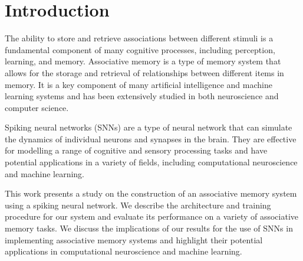 \chapter{Introduction}%

The ability to store and retrieve associations between different stimuli is a
fundamental component of many cognitive processes, including perception,
learning, and memory. Associative memory is a type of memory system that allows
for the storage and retrieval of relationships between different items in
memory. It is a key component of many artificial intelligence and machine
learning systems and has been extensively studied in both neuroscience and
computer science.

Spiking neural networks (SNNs) are a type of neural network that can simulate
the dynamics of individual neurons and synapses in the brain. They are
effective for modelling a range of cognitive and sensory processing tasks and
have potential applications in a variety of fields, including computational
neuroscience and machine learning.

This work presents a study on the construction of an associative memory system
using a spiking neural network. We describe the architecture and training
procedure for our system and evaluate its performance on a variety of
associative memory tasks. We discuss the implications of our results for the
use of SNNs in implementing associative memory systems and highlight their
potential applications in computational neuroscience and machine learning.

\thispagestyle{plain}